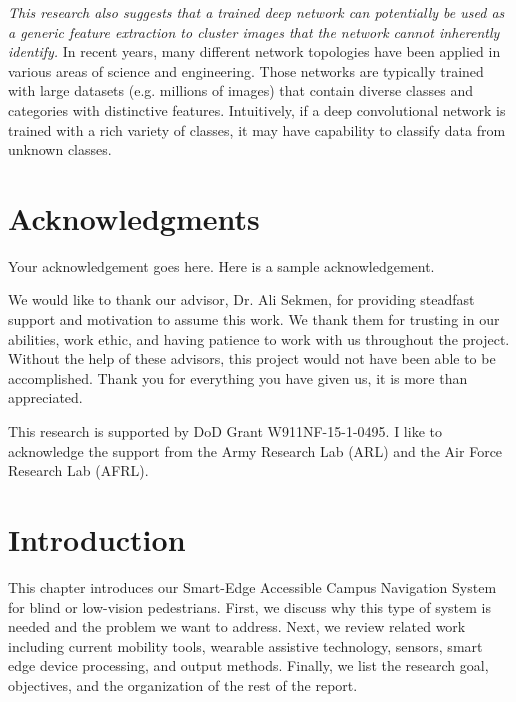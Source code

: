 \documentclass[12pt,letterpaper,oneside,reqno]{book}
\theoremstyle{plain}
\theoremstyle{definition}
\theoremstyle{plain}
\theoremstyle{remark}
\theoremstyle{plain}
\theoremstyle{definition}
\theoremstyle{plain}
\begin{document}
\textit{This research also suggests that a trained deep network can potentially be used as a generic feature extraction to cluster images that the network cannot inherently identify.} In recent years, many different network topologies have been applied in various areas of science and engineering. Those networks are typically trained with large datasets (e.g. millions of images) that contain diverse classes and categories with distinctive features. Intuitively, if a deep convolutional network is trained with a rich variety of classes, it may have capability to classify data from unknown classes.
\newpage
\doublespacing
\chapter{Acknowledgments}
{\color{red}Your acknowledgement goes here. Here is a sample acknowledgement.}

We would like to thank our advisor, Dr. Ali Sekmen, for providing steadfast support and motivation to assume this work. We thank them for trusting in our abilities, work ethic, and having patience to work with us throughout the project. Without the help of these advisors, this project would not have been able to be accomplished. Thank you for everything you have given us, it is more than appreciated.

This research is supported by DoD Grant W911NF-15-1-0495. I like to acknowledge the support from the Army Research Lab (ARL) and the Air Force Research Lab (AFRL).

\singlespacing
\tableofcontents

\listoffigures
{}

\listoftables
{}

\listofalgorithms
{}

\lstlistoflistings
{}

\doublespacing


\mainmatter
{}


\chapter{Introduction}
This chapter introduces our Smart-Edge Accessible Campus Navigation System for blind or low-vision pedestrians. First, we discuss why this type of system is needed and the problem we want to address. Next, we review related work including current mobility tools, wearable assistive technology, sensors, smart edge device processing, and output methods. Finally, we list the research goal, objectives, and the organization of the rest of the report.
\end{document}
